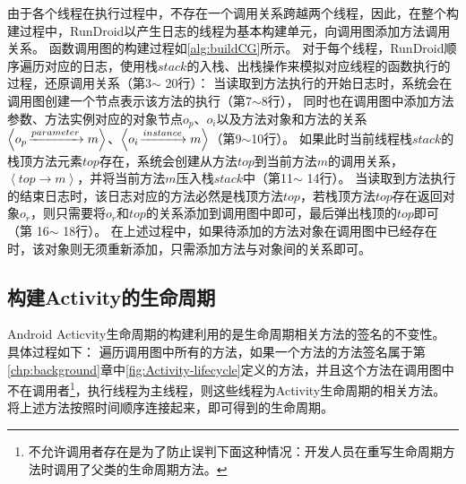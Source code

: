 
由于各个线程在执行过程中，不存在一个调用关系跨越两个线程，因此，在整个构建过程中，RunDroid以产生日志的线程为基本构建单元，向调用图添加方法调用关系。
函数调用图的构建过程如\autoref{alg:buildCG}所示。
对于每个线程，RunDroid顺序遍历对应的日志，使用栈$stack$的入栈、出栈操作来模拟对应线程的函数执行的过程，还原调用关系（第3$\sim$ 20行）：
当读取到方法执行的开始日志时，系统会在调用图创建一个节点表示该方法的执行（第7$\sim$8行），
同时也在调用图中添加方法参数、方法实例对应的对象节点$o_p$、$o_i$以及方法对象和方法的关系$ \left\langle  o_p \joinrel\xrightarrow{parameter}   m \right\rangle   $、$ \left\langle   o_i \joinrel\xrightarrow{instance}   m \right\rangle  $（第9$\sim$10行）。
如果此时当前线程栈$stack$的栈顶方法元素$top$存在，系统会创建从方法$top$到当前方法$m$的调用关系，$\left\langle top \to m \right \rangle  $，并将当前方法$m$压入栈$stack$中（第11$\sim$ 14行）。
当读取到方法执行的结束日志时，该日志对应的方法必然是栈顶方法$top$，若栈顶方法$top$存在返回对象$o_r$，则只需要将$o_r$和$top$的关系添加到调用图中即可，最后弹出栈顶的$top$即可（第 16$\sim$ 18行）。
在上述过程中，如果待添加的方法对象在调用图中已经存在时，该对象则无须重新添加，只需添加方法与对象间的关系即可。






\subsection{构建Activity的生命周期}

Android Acticvity生命周期的构建利用的是生命周期相关方法的签名的不变性。
具体过程如下：
遍历调用图中所有的方法，如果一个方法的方法签名属于第\ref{chp:background}章中\autoref{fig:Activity-lifecycle}定义的方法，并且这个方法在调用图中不在调用者\footnote{不允许调用者存在是为了防止误判下面这种情况：开发人员在重写生命周期方法时调用了父类的生命周期方法。}，执行线程为主线程，则这些线程为Activity生命周期的相关方法。
将上述方法按照时间顺序连接起来，即可得到的生命周期。

